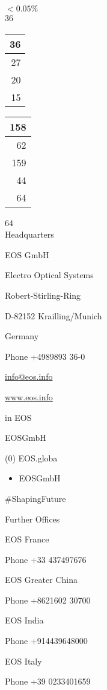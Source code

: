 \documentclass[10pt]{article}
\begin{document}
$<0.05 \%$\\
36

\begin{center}
\begin{tabular}{r}
36 \\
\hline
27 \\
\hline
20 \\
\hline
15 \\
\hline
\end{tabular}
\end{center}

\begin{center}
\begin{tabular}{r}
158 \\
\hline
62 \\
\hline
159 \\
\hline
44 \\
\hline
64 \\
\hline
\end{tabular}
\end{center}

64\\
Headquarters

EOS GmbH

Electro Optical Systems

Robert-Stirling-Ring

D-82152 Krailling/Munich

Germany

Phone +4989893 36-0

\href{mailto:info@eos.info}{info@eos.info}

\href{http://www.eos.info}{www.eos.info}

in EOS

EOSGmbH

(0) EOS.globa

\begin{itemize}
  \item EOSGmbH
\end{itemize}

\#ShapingFuture

Further Offices

EOS France

Phone +33 437497676

EOS Greater China

Phone +8621602 30700

EOS India

Phone +914439648000

EOS Italy

Phone +39 0233401659
\end{document}
